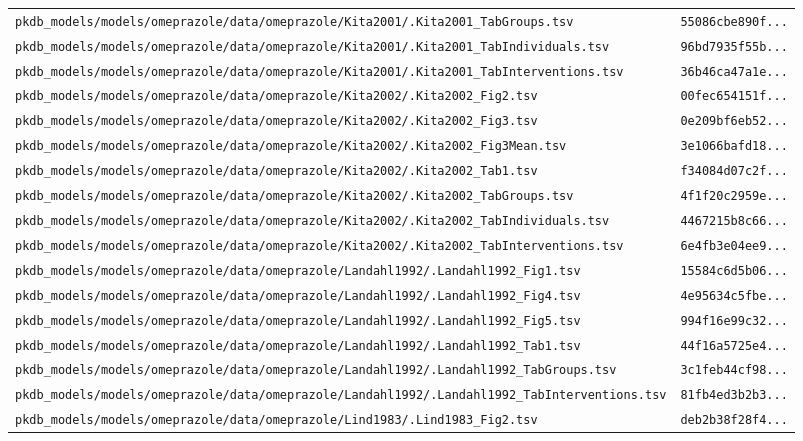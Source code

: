 \begin{longtable}{ll}
\texttt{pkdb\_models/models/omeprazole/data/omeprazole/Kita2001/.Kita2001\_TabGroups.tsv} & \texttt{55086cbe890f...} \\
\texttt{pkdb\_models/models/omeprazole/data/omeprazole/Kita2001/.Kita2001\_TabIndividuals.tsv} & \texttt{96bd7935f55b...} \\
\texttt{pkdb\_models/models/omeprazole/data/omeprazole/Kita2001/.Kita2001\_TabInterventions.tsv} & \texttt{36b46ca47a1e...} \\
\texttt{pkdb\_models/models/omeprazole/data/omeprazole/Kita2002/.Kita2002\_Fig2.tsv} & \texttt{00fec654151f...} \\
\texttt{pkdb\_models/models/omeprazole/data/omeprazole/Kita2002/.Kita2002\_Fig3.tsv} & \texttt{0e209bf6eb52...} \\
\texttt{pkdb\_models/models/omeprazole/data/omeprazole/Kita2002/.Kita2002\_Fig3Mean.tsv} & \texttt{3e1066bafd18...} \\
\texttt{pkdb\_models/models/omeprazole/data/omeprazole/Kita2002/.Kita2002\_Tab1.tsv} & \texttt{f34084d07c2f...} \\
\texttt{pkdb\_models/models/omeprazole/data/omeprazole/Kita2002/.Kita2002\_TabGroups.tsv} & \texttt{4f1f20c2959e...} \\
\texttt{pkdb\_models/models/omeprazole/data/omeprazole/Kita2002/.Kita2002\_TabIndividuals.tsv} & \texttt{4467215b8c66...} \\
\texttt{pkdb\_models/models/omeprazole/data/omeprazole/Kita2002/.Kita2002\_TabInterventions.tsv} & \texttt{6e4fb3e04ee9...} \\
\texttt{pkdb\_models/models/omeprazole/data/omeprazole/Landahl1992/.Landahl1992\_Fig1.tsv} & \texttt{15584c6d5b06...} \\
\texttt{pkdb\_models/models/omeprazole/data/omeprazole/Landahl1992/.Landahl1992\_Fig4.tsv} & \texttt{4e95634c5fbe...} \\
\texttt{pkdb\_models/models/omeprazole/data/omeprazole/Landahl1992/.Landahl1992\_Fig5.tsv} & \texttt{994f16e99c32...} \\
\texttt{pkdb\_models/models/omeprazole/data/omeprazole/Landahl1992/.Landahl1992\_Tab1.tsv} & \texttt{44f16a5725e4...} \\
\texttt{pkdb\_models/models/omeprazole/data/omeprazole/Landahl1992/.Landahl1992\_TabGroups.tsv} & \texttt{3c1feb44cf98...} \\
\texttt{pkdb\_models/models/omeprazole/data/omeprazole/Landahl1992/.Landahl1992\_TabInterventions.tsv} & \texttt{81fb4ed3b2b3...} \\
\texttt{pkdb\_models/models/omeprazole/data/omeprazole/Lind1983/.Lind1983\_Fig2.tsv} & \texttt{deb2b38f28f4...} \\

\end{longtable}
